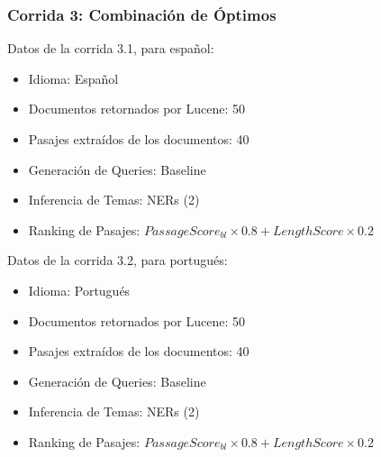 \begin{frame}
\frametitle{Corrida 3: Combinación de Óptimos}

\medskip

Datos de la corrida 3.1, para español:
\begin{itemize}
  \item Idioma: Español
  \item Documentos retornados por Lucene: 50
  \item Pasajes extraídos de los documentos: 40
  \item Generación de Queries: Baseline
  \item Inferencia de Temas: NERs (2)
  \item Ranking de Pasajes: $PassageScore_{bl} \times 0.8 + LengthScore \times 0.2$
\end{itemize}

\medskip
Datos de la corrida 3.2, para portugués:
\begin{itemize}
  \item Idioma: {\color{blue}Portugués}
  \item Documentos retornados por Lucene: 50
  \item Pasajes extraídos de los documentos: 40
  \item Generación de Queries: Baseline
  \item Inferencia de Temas: NERs (2)
  \item Ranking de Pasajes: $PassageScore_{bl} \times 0.8 + LengthScore \times 0.2$
\end{itemize}

\end{frame}

